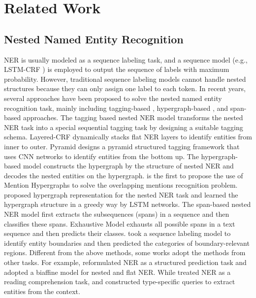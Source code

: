 \documentclass[11pt,a4paper]{article}
\begin{document}
\section{Related Work}

\subsection{Nested Named Entity Recognition}
NER is usually modeled as a sequence labeling task, and a sequence model (e.g., LSTM-CRF \citep{huang2015bidirectional}) is employed to output the sequence of labels with maximum probability. However, traditional sequence labeling models cannot handle nested structures because they can only assign one label to each token. In recent years, several approaches have been proposed to solve the nested named entity recognition task, mainly including tagging-based \citep{alex-etal-2007-recognising, wang-etal-2020-pyramid}, hypergraph-based \citep{muis-lu-2017-labeling, katiyar-cardie-2018-nested}, and span-based \citep{sohrab-miwa-2018-deep, zheng-etal-2019-boundary} approaches. The tagging based nested NER model transforms the nested NER task into a special sequential tagging task by designing a suitable tagging schema. Layered-CRF \citep{alex-etal-2007-recognising} dynamically stacks flat NER layers to identify entities from inner to outer. Pyramid \citep{wang-etal-2020-pyramid} designs a pyramid structured tagging framework that uses CNN networks to identify entities from the bottom up. The hypergraph-based model constructs the hypergraph by the structure of nested NER and decodes the nested entities on the hypergraph. \citet{lu-roth-2015-joint} is the first to propose the use of Mention Hypergraphs to solve the overlapping mentions recognition problem.
\citet{katiyar-cardie-2018-nested} proposed hypergraph representation for the nested NER task and learned the hypergraph structure in a greedy way by LSTM networks.
The span-based nested NER model first extracts the subsequences (spans) in a sequence and then classifies these spans. Exhaustive Model \citep{sohrab-miwa-2018-deep} exhausts all possible spans in a text sequence and then predicts their classes. \citet{zheng-etal-2019-boundary, Tan_Qiu_Chen_Wang_Huang_2020} took a sequence labeling model to identify entity boundaries and then predicted the categories of boundary-relevant regions. 
Different from the above methods,
some works adopt the methods from other tasks. For example, \citet{yu-etal-2020-named} 
reformulated NER as a structured prediction task and adopted a biaffine model for nested and flat NER. While \citet{li-etal-2020-unified} treated NER as a reading comprehension task, and constructed type-specific queries to extract entities from the context.
\end{document}
